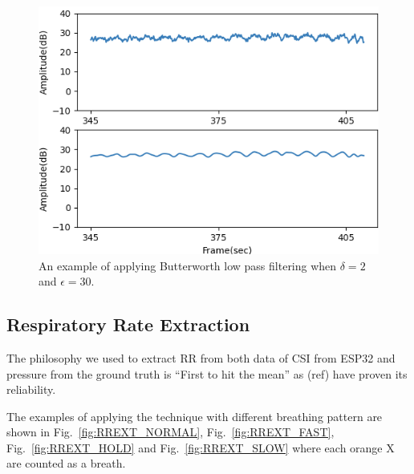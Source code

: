 \documentclass[10pt,letterpaper]{article}
\begin{document}
			\begin{figure}[htbp]
			\centerline{\includegraphics[width=120mm,scale=0.9]{FILPD_L2B.png}}
			\caption{An example of applying Butterworth low pass filtering when $\delta=2$ and $\epsilon=30$.}
			\label{fig:BPL}
				\end{figure}

		
	\subsection*{Respiratory Rate Extraction}
		
		The philosophy we used to extract RR from both data of CSI from ESP32 and pressure from the ground truth is ``First to hit the mean'' as (ref) have proven its reliability.
		
		The examples of applying the technique with different breathing pattern are shown in Fig.~\ref{fig:RREXT_NORMAL}, Fig.~\ref{fig:RREXT_FAST}, Fig.~\ref{fig:RREXT_HOLD} and  Fig.~\ref{fig:RREXT_SLOW} where each orange X are counted as a breath.
		
\end{document}
